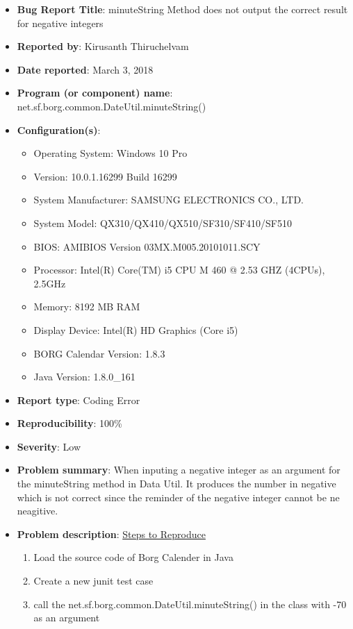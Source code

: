 \documentclass[fontsize=12pt,paper=letter,twoside]{scrartcl}
\begin{document}
\begin{itemize}
\begin{itemize}
\item \textbf{Bug Report Title}: minuteString Method does not output the correct result for negative integers
\item \textbf{Reported by}: Kirusanth Thiruchelvam
\item \textbf{Date reported}: March 3, 2018
\item \textbf{Program (or component) name}: net.sf.borg.common.DateUtil.minuteString()
\item \textbf{Configuration(s)}:
\begin{itemize}
\item Operating System: Windows 10 Pro 
\item Version: 10.0.1.16299 Build 16299
\item System Manufacturer: SAMSUNG ELECTRONICS CO., LTD.
\item System Model: QX310/QX410/QX510/SF310/SF410/SF510
\item BIOS: AMIBIOS Version 03MX.M005.20101011.SCY 
\item Processor: Intel(R) Core(TM) i5 CPU   M 460   @ 2.53 GHZ (4CPUs), ~ 2.5GHz
\item Memory: 8192 MB RAM
\item Display Device: Intel(R) HD Graphics (Core i5)
\item BORG Calendar Version: 1.8.3
\item Java Version: 1.8.0\_161
\end{itemize}
\item \textbf{Report type}: Coding Error
\item \textbf{Reproducibility}: 100\%
\item \textbf{Severity}: Low
\item \textbf{Problem summary}: When inputing a negative integer as an argument for the minuteString method in Data Util. It produces the number in negative which is not correct since the reminder of the negative integer cannot be ne neagitive.
\item \textbf{Problem description}:\newline
\underline{Steps to Reproduce}
\begin{enumerate}
\item Load the source code of Borg Calender in Java
 \item Create a new junit test case
 \item call the net.sf.borg.common.DateUtil.minuteString() in the class with -70 as an argument
\end {enumerate}

\end{itemize}
\end{itemize}
\end{document}
